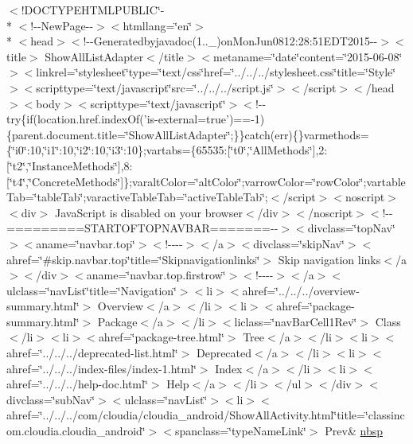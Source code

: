 \begin{DoxyCompactItemize}
\item 
$<$!D\-O\-C\-T\-Y\-P\-E\-H\-T\-M\-L\-P\-U\-B\-L\-I\-C\char`\"{}-\/\\*
$<$!-\/-\/New\-Page-\/-\/$>$$<$htmllang=\char`\"{}en\char`\"{}$>$\\*
$<$head$>$$<$!-\/-\/Generatedbyjavadoc(1..\-\_)on\-Mon\-Jun0812\-:28\-:51\-E\-D\-T2015-\/-\/$>$$<$title$>$ Show\-All\-List\-Adapter$<$/title$>$$<$metaname=\char`\"{}date\char`\"{}content=\char`\"{}2015-\/06-\/08\char`\"{}$>$$<$linkrel=\char`\"{}stylesheet\char`\"{}type=\char`\"{}text/css\char`\"{}href=\char`\"{}../../../stylesheet.\-css\char`\"{}title=\char`\"{}\-Style\char`\"{}$>$$<$scripttype=\char`\"{}text/javascript\char`\"{}src=\char`\"{}../../../script.\-js\char`\"{}$>$$<$/script$>$$<$/head$>$$<$body$>$$<$scripttype=\char`\"{}text/javascript\char`\"{}$>$$<$!-\/-\/try\{if(location.\-href.\-index\-Of('is-\/external=true')==-\/1)\{parent.\-document.\-title=\char`\"{}\-Show\-All\-List\-Adapter\char`\"{};\}\}catch(err)\{\}varmethods=\{\char`\"{}i0\char`\"{}\-:10,\char`\"{}i1\char`\"{}\-:10,\char`\"{}i2\char`\"{}\-:10,\char`\"{}i3\char`\"{}\-:10\};vartabs=\{65535\-:\mbox{[}\char`\"{}t0\char`\"{},\char`\"{}\-All\-Methods\char`\"{}\mbox{]},2\-:\mbox{[}\char`\"{}t2\char`\"{},\char`\"{}\-Instance\-Methods\char`\"{}\mbox{]},8\-:\mbox{[}\char`\"{}t4\char`\"{},\char`\"{}\-Concrete\-Methods\char`\"{}\mbox{]}\};varalt\-Color=\char`\"{}alt\-Color\char`\"{};varrow\-Color=\char`\"{}row\-Color\char`\"{};vartable\-Tab=\char`\"{}table\-Tab\char`\"{};varactive\-Table\-Tab=\char`\"{}active\-Table\-Tab\char`\"{};$<$/script$>$$<$noscript$>$$<$div$>$ Java\-Script is disabled on your browser$<$/div$>$$<$/noscript$>$$<$!-\/-\/=========\-S\-T\-A\-R\-T\-O\-F\-T\-O\-P\-N\-A\-V\-B\-A\-R=======-\/-\/$>$$<$divclass=\char`\"{}top\-Nav\char`\"{}$>$$<$aname=\char`\"{}navbar.\-top\char`\"{}$>$$<$!-\/-\/-\/-\/$>$$<$/a$>$$<$divclass=\char`\"{}skip\-Nav\char`\"{}$>$$<$ahref=\char`\"{}\#skip.\-navbar.\-top\char`\"{}title=\char`\"{}\-Skipnavigationlinks\char`\"{}$>$ Skip navigation links$<$/a$>$$<$/div$>$$<$aname=\char`\"{}navbar.\-top.\-firstrow\char`\"{}$>$$<$!-\/-\/-\/-\/$>$$<$/a$>$$<$ulclass=\char`\"{}nav\-List\char`\"{}title=\char`\"{}\-Navigation\char`\"{}$>$$<$li$>$$<$ahref=\char`\"{}../../../overview-\/summary.\-html\char`\"{}$>$ Overview$<$/a$>$$<$/li$>$$<$li$>$$<$ahref=\char`\"{}package-\/summary.\-html\char`\"{}$>$ Package$<$/a$>$$<$/li$>$$<$liclass=\char`\"{}nav\-Bar\-Cell1\-Rev\char`\"{}$>$ Class$<$/li$>$$<$li$>$$<$ahref=\char`\"{}package-\/tree.\-html\char`\"{}$>$ Tree$<$/a$>$$<$/li$>$$<$li$>$$<$ahref=\char`\"{}../../../deprecated-\/list.\-html\char`\"{}$>$ Deprecated$<$/a$>$$<$/li$>$$<$li$>$$<$ahref=\char`\"{}../../../index-\/files/index-\/1.\-html\char`\"{}$>$ Index$<$/a$>$$<$/li$>$$<$li$>$$<$ahref=\char`\"{}../../../help-\/doc.\-html\char`\"{}$>$ Help$<$/a$>$$<$/li$>$$<$/ul$>$$<$/div$>$$<$divclass=\char`\"{}sub\-Nav\char`\"{}$>$$<$ulclass=\char`\"{}nav\-List\char`\"{}$>$$<$li$>$$<$ahref=\char`\"{}../../../com/cloudia/cloudia\-\_\-android/\-Show\-All\-Activity.\-html\char`\"{}title=\char`\"{}classincom.\-cloudia.\-cloudia\-\_\-android\char`\"{}$>$$<$spanclass=\char`\"{}type\-Name\-Link\char`\"{}$>$ Prev\& \hyperlink{_show_all_list_adapter_8html_aef915316f784c9063d942974538301a6}{nbsp}

\end{DoxyCompactItemize}
